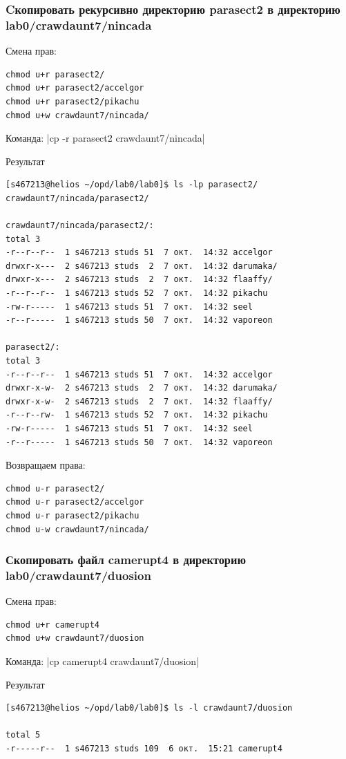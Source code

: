 \subsubsection*{Cкопировать рекурсивно директорию parasect2 в директорию lab0/crawdaunt7/nincada}
Смена прав: 
\begin{verbatim}
chmod u+r parasect2/
chmod u+r parasect2/accelgor
chmod u+r parasect2/pikachu
chmod u+w crawdaunt7/nincada/
\end{verbatim}

Команда: |cp -r parasect2 crawdaunt7/nincada|

Результат
\begin{verbatim}
[s467213@helios ~/opd/lab0/lab0]$ ls -lp parasect2/ crawdaunt7/nincada/parasect2/

crawdaunt7/nincada/parasect2/:
total 3
-r--r--r--  1 s467213 studs 51  7 окт.  14:32 accelgor
drwxr-x---  2 s467213 studs  2  7 окт.  14:32 darumaka/
drwxr-x---  2 s467213 studs  2  7 окт.  14:32 flaaffy/
-r--r--r--  1 s467213 studs 52  7 окт.  14:32 pikachu
-rw-r-----  1 s467213 studs 51  7 окт.  14:32 seel
-r--r-----  1 s467213 studs 50  7 окт.  14:32 vaporeon

parasect2/:
total 3
-r--r--r--  1 s467213 studs 51  7 окт.  14:32 accelgor
drwxr-x-w-  2 s467213 studs  2  7 окт.  14:32 darumaka/
drwxr-x-w-  2 s467213 studs  2  7 окт.  14:32 flaaffy/
-r--r--rw-  1 s467213 studs 52  7 окт.  14:32 pikachu
-rw-r-----  1 s467213 studs 51  7 окт.  14:32 seel
-r--r-----  1 s467213 studs 50  7 окт.  14:32 vaporeon
\end{verbatim}

Возвращаем права:
\begin{verbatim}
chmod u-r parasect2/
chmod u-r parasect2/accelgor
chmod u-r parasect2/pikachu
chmod u-w crawdaunt7/nincada/
\end{verbatim}

\subsubsection*{Скопировать файл camerupt4 в директорию lab0/crawdaunt7/duosion}
Смена прав: 
\begin{verbatim}
chmod u+r camerupt4
chmod u+w crawdaunt7/duosion
\end{verbatim}

Команда: |cp camerupt4 crawdaunt7/duosion|

Результат
\begin{verbatim}
[s467213@helios ~/opd/lab0/lab0]$ ls -l crawdaunt7/duosion

total 5
-r-----r--  1 s467213 studs 109  6 окт.  15:21 camerupt4
\end{verbatim}

